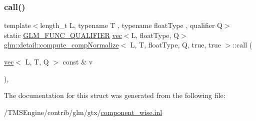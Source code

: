 \subsubsection{\texorpdfstring{call()}{call()}}
{\footnotesize\ttfamily template$<$length\+\_\+t L, typename T , typename float\+Type , qualifier Q$>$ \\
static \hyperlink{setup_8hpp_a33fdea6f91c5f834105f7415e2a64407}{G\+L\+M\+\_\+\+F\+U\+N\+C\+\_\+\+Q\+U\+A\+L\+I\+F\+I\+ER} \hyperlink{structglm_1_1vec}{vec}$<$L, float\+Type, Q$>$ \hyperlink{structglm_1_1detail_1_1compute__comp_normalize}{glm\+::detail\+::compute\+\_\+comp\+Normalize}$<$ L, T, float\+Type, Q, true, true $>$\+::call (\begin{DoxyParamCaption}\item[{\hyperlink{structglm_1_1vec}{vec}$<$ L, T, Q $>$ const \&}]{v }\end{DoxyParamCaption})\hspace{0.3cm}{\ttfamily [inline]}, {\ttfamily [static]}}



The documentation for this struct was generated from the following file\+:\begin{DoxyCompactItemize}
\item 
/\+T\+M\+S\+Engine/contrib/glm/gtx/\hyperlink{component__wise_8inl}{component\+\_\+wise.\+inl}\end{DoxyCompactItemize}

